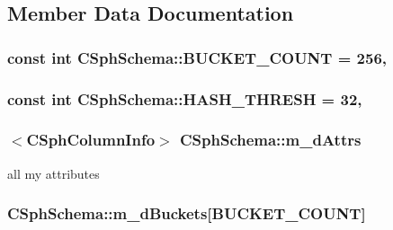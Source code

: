\subsection{Member Data Documentation}
\hypertarget{classCSphSchema_aeb38dfa5e7b6aa1b575487d67b73cf9e}{
\subsubsection[{B\-U\-C\-K\-E\-T\-\_\-\-C\-O\-U\-N\-T}]{\setlength{\rightskip}{0pt plus 5cm}const {\bf int} C\-Sph\-Schema\-::\-B\-U\-C\-K\-E\-T\-\_\-\-C\-O\-U\-N\-T = 256\hspace{0.3cm}{\ttfamily [static]}, {\ttfamily [protected]}}}\label{classCSphSchema_aeb38dfa5e7b6aa1b575487d67b73cf9e}
\hypertarget{classCSphSchema_a06381a7bc923a8ebc3c77cabb9330078}{
\subsubsection[{H\-A\-S\-H\-\_\-\-T\-H\-R\-E\-S\-H}]{\setlength{\rightskip}{0pt plus 5cm}const {\bf int} C\-Sph\-Schema\-::\-H\-A\-S\-H\-\_\-\-T\-H\-R\-E\-S\-H = 32\hspace{0.3cm}{\ttfamily [static]}, {\ttfamily [protected]}}}\label{classCSphSchema_a06381a7bc923a8ebc3c77cabb9330078}
\hypertarget{classCSphSchema_a94fe33df4b82a02dd2581053d0832331}{
\subsubsection[{m\-\_\-d\-Attrs}]{$<${\bf C\-Sph\-Column\-Info}$>$ C\-Sph\-Schema\-::m\-\_\-d\-Attrs}}\label{classCSphSchema_a94fe33df4b82a02dd2581053d0832331}


all my attributes 

\hypertarget{classCSphSchema_ae45e9f7aa6c6689c55207315b723cb4a}{
\subsubsection[{m\-\_\-d\-Buckets}]{ C\-Sph\-Schema\-::m\-\_\-d\-Buckets\mbox{[}{\bf B\-U\-C\-K\-E\-T\-\_\-\-C\-O\-U\-N\-T}\mbox{]}\hspace{0.3cm}{\ttfamily [protected]}}}\label{classCSphSchema_ae45e9f7aa6c6689c55207315b723cb4a}



